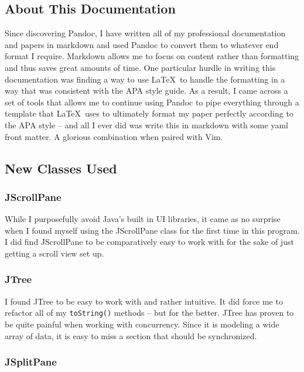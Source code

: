 \documentclass[english,floatsintext,man]{apa6}
\begin{document}
\subsection{About This Documentation}\label{about-this-documentation}

Since discovering Pandoc, I have written all of my professional
documentation and papers in markdown and used Pandoc to convert them to
whatever end format I require. Markdown allows me to focus on content
rather than formatting and thus saves great amounts of time. One
particular hurdle in writing this documentation was finding a way to use
\LaTeX~to handle the formatting in a way that was consistent with the
APA style guide. As a result, I came across a set of tools that allows
me to continue using Pandoc to pipe everything through a template that
\LaTeX~uses to ultimately format my paper perfectly according to the APA
style -- and all I ever did was write this in markdown with some yaml
front matter. A glorious combination when paired with Vim.

\subsection{New Classes Used}\label{new-classes-used}

\subsubsection{JScrollPane}\label{jscrollpane}

While I purposefully avoid Java's built in UI libraries, it came as no
surprise when I found myself using the JScrollPane class for the first
time in this program. I did find JScrollPane to be comparatively easy to
work with for the sake of just getting a scroll view set up.

\subsubsection{JTree}\label{jtree}

I found JTree to be easy to work with and rather intuitive. It did force
me to refactor all of my \texttt{toString()} methods -- but for the
better. JTree has proven to be quite painful when working with
concurrency. Since it is modeling a wide array of data, it is easy to
miss a section that should be synchronized.

\subsubsection{JSplitPane}\label{jsplitpane}
\end{document}
